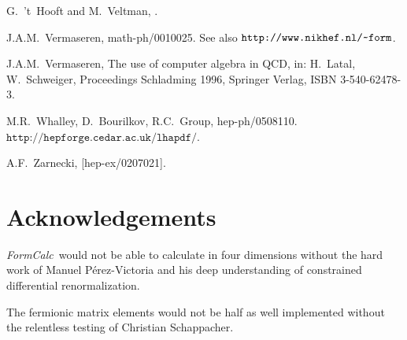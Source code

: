 \documentclass[twoside,11pt]{article}
\def\FC{\textit{FormCalc}}
\def\Code#1{\ensuremath{\texttt{#1}}}
\def\home{\symbol{126}}
\begin{document}
\begin{flushleft}
\begin{thebibliography}{999}
G.~'t~Hooft and M.~Veltman, .

J.A.M.~Vermaseren, math-ph/0010025.
See also \Code{http://www.nikhef.nl/\home form}.

J.A.M.~Vermaseren, The use of computer algebra in QCD, in: H.~Latal, 
W.~Schweiger, Proceedings Schladming 1996, Springer Verlag, ISBN
3-540-62478-3.

M.R.~Whalley, D.~Bourilkov, R.C.~Group, hep-ph/0508110.
\Code{http://hepforge.cedar.ac.uk/lhapdf/}.

A.F.~Zarnecki,  [hep-ex/0207021].

\end{thebibliography}
\end{flushleft}

\section*{Acknowledgements}

\FC\ would not be able to calculate in four dimensions without the hard
work of Manuel P\'erez-Victoria and his deep understanding of constrained
differential renormalization.

The fermionic matrix elements would not be half as well implemented
without the relentless testing of Christian Schappacher.


\printindex
\end{document}
